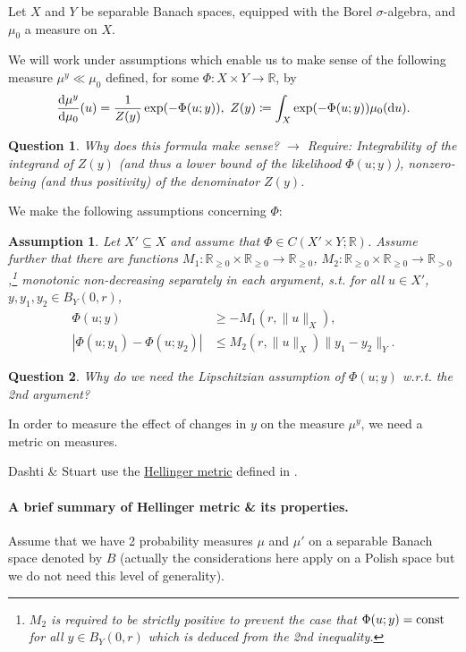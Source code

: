 \documentclass[oneside,11pt]{book}
\numberwithin{equation}{section}
\newtheorem{assumption}{Assumption}[section]
\newtheorem{question}{Question}[section]
\begin{document}
Let $X$ and $Y$ be separable Banach spaces, equipped with the Borel $\sigma$-algebra, and $\mu_0$ a measure on $X$.

We will work under assumptions which enable us to make sense of the following measure $\mu^y\ll\mu_0$ defined, for some $\Phi: X\times Y\to\mathbb{R}$, by
\begin{align*}
    \frac{{\rm d}\mu^y}{{\rm d}\mu_0}(u) = \frac{1}{Z(y)}\exp(-\Phi(u;y)),\ Z(y)\coloneqq\int_X \exp(-\Phi(u;y))\mu_0({\rm d}u).
\end{align*}

\begin{question}
    Why does this formula make sense? \emph{$\to$ Require: Integrability of the integrand of $Z(y)$ (and thus a lower bound of the likelihood $\Phi(u;y)$), nonzero-being (and thus positivity) of the denominator $Z(y)$.}
\end{question}
We make the following assumptions concerning $\Phi$:

\begin{assumption}
    \label{assumption 1}
    Let $X'\subseteq X$ and assume that $\Phi\in C(X'\times Y;\mathbb{R})$. Assume further that there are functions $M_1:\mathbb{R}_{\ge 0}\times\mathbb{R}_{\ge 0}\to\mathbb{R}_{\ge 0}$, $M_2:\mathbb{R}_{\ge 0}\times\mathbb{R}_{\ge 0}\to\mathbb{R}_{> 0}$,\footnote{$M_2$ is required to be strictly positive to prevent the case that $\Phi(u;y) = {\rm const}$ for all $y\in B_Y(0,r)$ which is deduced from the 2nd inequality.} monotonic non-decreasing separately in each argument, s.t. for all $u\in X'$, $y,y_1,y_2\in B_Y(0,r)$,
    \begin{align*}
        \Phi(u;y)&\ge-M_1(r,\|u\|_X),\\
        |\Phi(u;y_1) - \Phi(u;y_2)|&\le M_2(r,\|u\|_X)\|y_1 - y_2\|_Y.
    \end{align*}
\end{assumption}

\begin{question}
    Why do we need the Lipschitzian assumption of $\Phi(u;y)$ w.r.t. the 2nd argument?
\end{question}

In order to measure the effect of changes in $y$ on the measure $\mu^y$, we need a metric on measures.

Dashti \& Stuart use the \href{https://en.wikipedia.org/wiki/Hellinger_distance}{Hellinger metric} defined in \cite[Sect. A.2.4]{Dashti_Stuart2017}.

\paragraph*{A brief summary of Hellinger metric \& its properties.} Assume that we have 2 probability measures $\mu$ and $\mu'$ on a separable Banach space denoted by $B$ (actually the considerations here apply on a Polish space but we do not need this level of generality).
\end{document}
